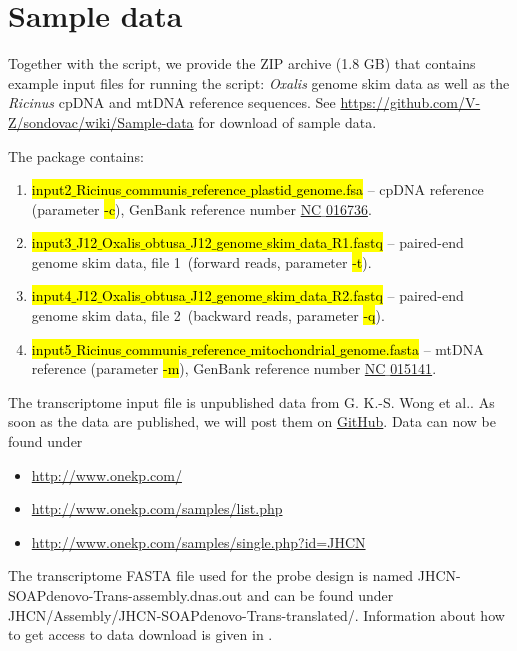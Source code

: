 \documentclass[a4paper, 11pt, twoside]{article}
\renewcommand{\texttt}[1]{\hl{\ttfamily #1}}
\begin{document}
\section{Sample data} %

Together with the script, we provide the ZIP archive (1.8 GB) that contains example input files for running the script: \textit{Oxalis} genome skim data as well as the \textit{Ricinus} cpDNA and mtDNA reference sequences. See \url{https://github.com/V-Z/sondovac/wiki/Sample-data} for download of sample data.

The package contains:

\begin{enumerate}
  \item \texttt{input2$\_$Ricinus$\_$communis$\_$reference$\_$plastid$\_$genome.fsa} -- cpDNA reference (para\-meter \texttt{-c}), GenBank reference number \href{http://www.ncbi.nlm.nih.gov/nuccore/372450118/}{NC$\_$016736}.
  \item \texttt{input3$\_$J12$\_$Oxalis$\_$obtusa$\_$J12$\_$genome$\_$skim$\_$data$\_$R1.fastq} -- paired-end genome sk\-im data, file 1~(forward reads, parameter \texttt{-t}).
  \item \texttt{input4$\_$J12$\_$Oxalis$\_$obtusa$\_$J12$\_$genome$\_$skim$\_$data$\_$R2.fastq} -- paired-end genome sk\-im data, file 2~(backward reads, parameter \texttt{-q}).
  \item \texttt{input5$\_$Ricinus$\_$communis$\_$reference$\_$mitochondrial$\_$genome.fasta} -- mtDNA reference (parameter \texttt{-m}), GenBank reference number \href{http://www.ncbi.nlm.nih.gov/nuccore/323649872/}{NC$\_$015141}.
\end{enumerate}

The transcriptome input file is unpublished data from G. K.-S. Wong et al.. As soon as the data are published, we will post them on \href{https://github.com/V-Z/sondovac/wiki/Sample-data}{GitHub}. Data can now be found under

\begin{itemize}
  \item \url{http://www.onekp.com/}
  \item \url{http://www.onekp.com/samples/list.php}
  \item \url{http://www.onekp.com/samples/single.php?id=JHCN}
\end{itemize}

The transcriptome FASTA file used for the probe design is named JHCN-SOAPdenovo-Trans-assembly.dnas.out and can be found under JHCN/Assembly/JHCN-SOAPdenovo-Trans-translated/. Information about how to get access to data download is given in \citet{Matasci2014}.
\end{document}
